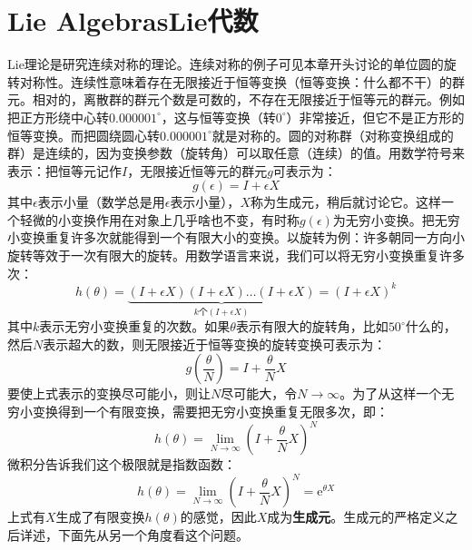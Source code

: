 \section[Lie代数]{Lie Algebras\quad Lie代数}
\label{sec3.4}
Lie理论是研究连续对称的理论。连续对称的例子可见本章开头讨论的单位圆的旋转对称性。连续性意味着存在无限接近于恒等变换（恒等变换：什么都不干）的群元。相对的，离散群的群元个数是可数的，不存在无限接近于恒等元的群元。例如把正方形绕中心转$0.000001^\circ$，这与恒等变换（转$0^\circ$）非常接近，但它不是正方形的恒等变换。而把圆绕圆心转$0.000001^\circ$就是对称的。圆的对称群（对称变换组成的群）是连续的，因为变换参数（旋转角）可以取任意（连续）的值。用数学符号来表示：把恒等元记作$I$，无限接近恒等元的群元$g$可表示为：
\begin{equation}
\label{equ3.48}
g(\epsilon) = I + \epsilon X
\end{equation}
其中$\epsilon$表示小量（数学总是用$\epsilon$表示小量），$X$称为生成元，稍后就讨论它。这样一个轻微的小变换作用在对象上几乎啥也不变，有时称$g(\epsilon)$为无穷小变换。把无穷小变换重复许多次就能得到一个有限大小的变换。以旋转为例：许多朝同一方向小旋转等效于一次有限大的旋转。用数学语言来说，我们可以将无穷小变换重复许多次：
\begin{equation}
\label{equ3.49}
h(\theta) = \underbrace{(I + \epsilon X)(I + \epsilon X) \dots (I + \epsilon X)}_{k\text{个}(I + \epsilon X)} = (I + \epsilon X)^k
\end{equation}
其中$k$表示无穷小变换重复的次数。如果$\theta$表示有限大的旋转角，比如$50^\circ$什么的，然后$N$表示超大的数，则无限接近于恒等变换的旋转变换可表示为：
\begin{equation}
\label{equ3.50}
g(\frac{\theta}{N}) = I + \frac{\theta}{N} X
\end{equation}
要使上式表示的变换尽可能小，则让$N$尽可能大，令$N \rightarrow \infty$。为了从这样一个无穷小变换得到一个有限变换，需要把无穷小变换重复无限多次，即：
\begin{equation}
\label{equ3.51}
h(\theta) = \lim_{N \rightarrow \infty} \left( I + \frac{\theta}{N}X \right)^N
\end{equation}
微积分告诉我们这个极限就是指数函数：
\begin{equation}
\label{equ3.52}
h(\theta) = \lim_{N \rightarrow \infty} \left( I + \frac{\theta}{N}X \right)^N = \mathrm{e}^{\theta X}
\end{equation}
上式有$X$生成了有限变换$h(\theta)$的感觉，因此$X$成为{\bf 生成元}。生成元的严格定义之后详述，下面先从另一个角度看这个问题。

